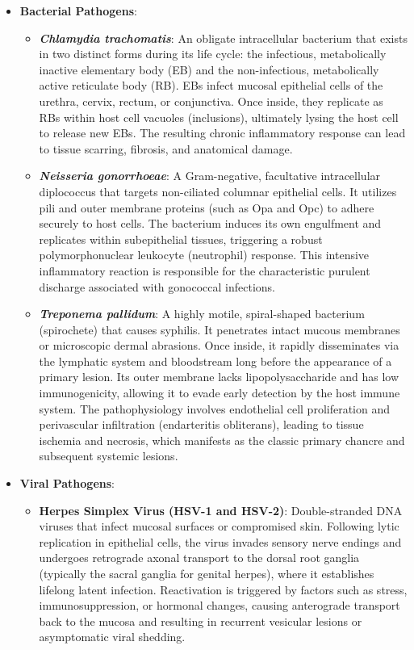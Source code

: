 \begin{itemize}
    \item \textbf{Bacterial Pathogens}:
    \begin{itemize}
        \item \textbf{\textit{Chlamydia trachomatis}}: An obligate intracellular bacterium that exists in two distinct forms during its life cycle: the infectious, metabolically inactive elementary body (EB) and the non-infectious, metabolically active reticulate body (RB). EBs infect mucosal epithelial cells of the urethra, cervix, rectum, or conjunctiva. Once inside, they replicate as RBs within host cell vacuoles (inclusions), ultimately lysing the host cell to release new EBs. The resulting chronic inflammatory response can lead to tissue scarring, fibrosis, and anatomical damage.
        \item \textbf{\textit{Neisseria gonorrhoeae}}: A Gram-negative, facultative intracellular diplococcus that targets non-ciliated columnar epithelial cells. It utilizes pili and outer membrane proteins (such as Opa and Opc) to adhere securely to host cells. The bacterium induces its own engulfment and replicates within subepithelial tissues, triggering a robust polymorphonuclear leukocyte (neutrophil) response. This intensive inflammatory reaction is responsible for the characteristic purulent discharge associated with gonococcal infections.
        \item \textbf{\textit{Treponema pallidum}}: A highly motile, spiral-shaped bacterium (spirochete) that causes syphilis. It penetrates intact mucous membranes or microscopic dermal abrasions. Once inside, it rapidly disseminates via the lymphatic system and bloodstream long before the appearance of a primary lesion. Its outer membrane lacks lipopolysaccharide and has low immunogenicity, allowing it to evade early detection by the host immune system. The pathophysiology involves endothelial cell proliferation and perivascular infiltration (endarteritis obliterans), leading to tissue ischemia and necrosis, which manifests as the classic primary chancre and subsequent systemic lesions.
    \end{itemize}
    \item \textbf{Viral Pathogens}:
    \begin{itemize}
        \item \textbf{Herpes Simplex Virus (HSV-1 and HSV-2)}: Double-stranded DNA viruses that infect mucosal surfaces or compromised skin. Following lytic replication in epithelial cells, the virus invades sensory nerve endings and undergoes retrograde axonal transport to the dorsal root ganglia (typically the sacral ganglia for genital herpes), where it establishes lifelong latent infection. Reactivation is triggered by factors such as stress, immunosuppression, or hormonal changes, causing anterograde transport back to the mucosa and resulting in recurrent vesicular lesions or asymptomatic viral shedding.

\end{itemize}
\end{itemize}
